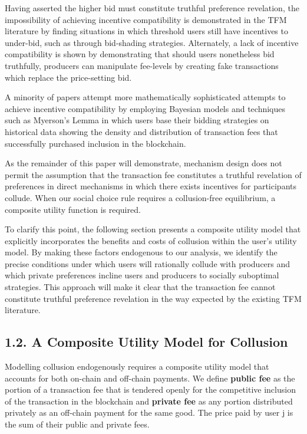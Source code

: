 \documentclass[oneside]{article}   	%
\begin{document}
Having asserted the higher bid must constitute truthful preference revelation, the impossibility of achieving incentive compatibility is demonstrated in the TFM literature by finding situations in which threshold users still have incentives to under-bid, such as through bid-shading strategies. Alternately, a lack of incentive compatibility is shown by demonstrating that should users nonetheless bid truthfully, producers can manipulate fee-levels by creating fake transactions which replace the price-setting bid.

A minority of papers attempt more mathematically sophisticated attempts to achieve incentive compatibility by employing Bayesian models and techniques such as Myerson's Lemma in which users base their bidding strategies on historical data showing the density and distribution of transaction fees that successfully purchased inclusion in the blockchain. 

As the remainder of this paper will demonstrate, mechanism design does not permit the assumption that the transaction fee constitutes a truthful revelation of preferences in direct mechanisms in which there exists incentives for participants collude. When our social choice rule requires a collusion-free equilibrium, a composite utility function is required.

To clarify this point, the following section presents a composite utility model that explicitly incorporates the benefits and costs of collusion within the user's utility model. By making these factors endogenous to our analysis, we identify the precise conditions under which users will rationally collude with producers and which private preferences incline users and producers to socially suboptimal strategies. This approach will make it clear that the transaction fee cannot constitute truthful preference revelation in the way expected by the existing TFM literature.

\subsection*{1.2. A Composite Utility Model for Collusion}
\vspace{0.5em}

Modelling collusion endogenously requires a composite utility model that accounts for both on-chain and off-chain payments. We define \textbf{public fee} as the portion of a transaction fee that is tendered openly for the competitive inclusion of the transaction in the blockchain and \textbf{private fee} as any portion distributed privately as an off-chain payment for the same good. The price paid by user j is the sum of their public and private fees.
\end{document}
